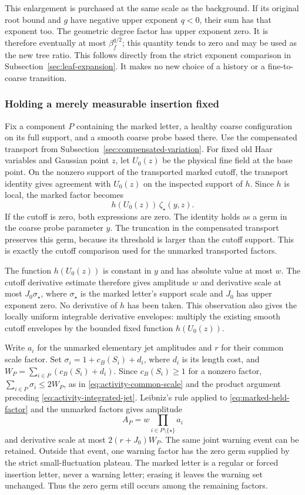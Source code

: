 This enlargement is purchased at the same scale as the background.
If its original root bound and $g$ have negative upper exponent
$q<0$, their sum has that exponent too. The geometric degree factor
has upper exponent zero. It is therefore eventually at most
$\beta_f^{q/2}$; this quantity tends to zero and may be used as
the new tree ratio. This follows directly from the strict exponent
comparison in Subsection~\ref{sec:leaf-expansion}. It makes no new
choice of a history or a fine-to-coarse transition.

\subsubsection{Holding a merely measurable insertion fixed}
Fix a component $P$ containing the marked letter, a healthy coarse
configuration on its full support, and a smooth coarse probe based
there. Use the compensated transport from
Subsection~\ref{sec:compensated-variation}. For fixed old Haar variables
and Gaussian point $z$, let $U_0(z)$ be the physical fine field at
the base point. On the nonzero support of the transported marked
cutoff, the transport identity gives agreement with $U_0(z)$ on
the inspected support of $h$. Since $h$ is local, the marked
factor becomes
\begin{equation}\label{eq:marked-held-factor}
                  h(U_0(z))\,\zeta_\star(y,z).
\end{equation}
If the cutoff is zero, both expressions are zero. The identity
holds as a germ in the coarse probe parameter $y$. The truncation
in the compensated transport preserves this germ, because its
threshold is larger than the cutoff support. This is exactly the
cutoff comparison used for the unmarked transported factors.

The function $h(U_0(z))$ is constant in $y$ and has absolute value
at most $w$. The cutoff derivative estimate therefore gives
amplitude $w$ and derivative scale at most $J_0\sigma_\star$, where
$\sigma_\star$ is the marked letter's support scale and $J_0$
has upper exponent zero. No derivative of $h$ has been taken.
This observation also gives the locally uniform integrable
derivative envelopes: multiply the existing smooth cutoff envelopes
by the bounded fixed function $h(U_0(z))$.

Write $a_i$ for the unmarked elementary jet amplitudes and $r$
for their common scale factor. Set $\sigma_i=1+c_B(S_i)+d_i$,
where $d_i$ is its length cost, and
$W_P=\sum_{i\in P}(c_B(S_i)+d_i)$. Since $c_B(S_i)\ge1$ for a
nonzero factor, $\sum_{i\in P}\sigma_i\le2W_P$, as in
\eqref{eq:activity-common-scale} and the product argument preceding
\eqref{eq:activity-integrated-jet}.
Leibniz's rule applied to \eqref{eq:marked-held-factor} and the
unmarked factors gives amplitude
\[
                    A_P=w\prod_{i\in P\setminus\{\star\}}a_i
\]
and derivative scale at most $2(r+J_0)W_P$.
The same joint warning event can be retained. Outside that event,
one warning factor has the zero germ supplied by the strict
small-fluctuation plateau. The marked letter is a regular or forced
insertion letter, never a warning letter; erasing it leaves the
warning set unchanged. Thus the zero germ still occurs among the
remaining factors.


